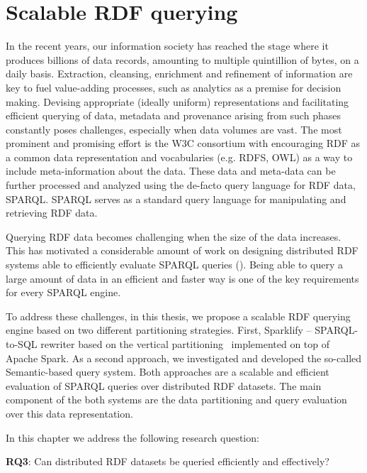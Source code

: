 \chapter{Scalable RDF querying}
\label{chapter:scalable_rdf_querying}
In the recent years, our information society has reached the stage where it produces billions of data records, amounting to multiple quintillion of bytes, on a daily basis.
Extraction, cleansing, enrichment and refinement of information are key to fuel value-adding processes, such as analytics as a premise for decision making.
Devising appropriate (ideally uniform) representations and facilitating efficient querying of data, metadata and provenance arising from such phases constantly poses challenges, especially when data volumes are vast.
The most prominent and promising effort is the \gls{W3C} consortium with encouraging \gls{RDF} as a common data representation and vocabularies (e.g. RDFS, \gls{OWL}) as a way to include meta-information about the data.
These data and meta-data can be further processed and analyzed using the de-facto query language for \gls{RDF} data, \gls{SPARQL}.
\gls{SPARQL} serves as a standard query language for manipulating and retrieving \gls{RDF} data.

Querying \gls{RDF} data becomes challenging when the size of the data increases. 
This has motivated a considerable amount of work on designing distributed \gls{RDF} systems able to efficiently evaluate \gls{SPARQL} queries (\cite{Schatzle:2016:SRQ:2977797.2977806,sparqlgx-iswc-2016}).
Being able to query a large amount of data in an efficient and faster way is one of the key requirements for every \gls{SPARQL} engine.

To address these challenges, in this thesis, we propose a scalable \gls{RDF} querying engine based on two different partitioning strategies.
First, Sparklify -- SPARQL-to-SQL rewriter based on the vertical partitioning~\cite{VPAbadi2007} implemented on top of Apache Spark.
As a second approach, we investigated and developed the so-called Semantic-based query system. 
Both approaches are a scalable and efficient evaluation of \gls{SPARQL} queries over distributed \gls{RDF} datasets. 
The main component of the both systems are the data partitioning and query evaluation over this data representation.

In this chapter we address the following research question:
\begin{tcolorbox}
\textbf{RQ3}: Can distributed \gls{RDF} datasets be queried efficiently and effectively?
\end{tcolorbox}

